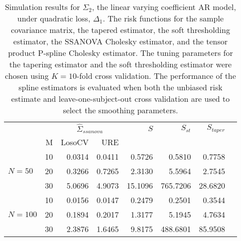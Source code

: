 \documentclass[12pt]{article}
\theoremstyle{definition}
\begin{document}

\begin{table}[ht]
\centering
\caption{Simulation results for $\Sigma_2$, the  linear varying coefficient AR model, under quadratic loss, $\Delta_1$. The risk functions for the sample covariance matrix, the tapered estimator, the soft thresholding estimator, the SSANOVA Cholesky estimator, and the tensor product P-spline Cholesky estimator. The tuning parameters for the tapering estimator and the soft thresholding estimator were chosen using $K = 10$-fold cross validation. The performance of the spline estimators is evaluated when both the unbiased risk estimate and leave-one-subject-out cross validation are used to select the smoothing parameters.}
\begin{tabular}{l|r|rrrrrr}
&  & \multicolumn{2}{c}{$\hat{\Sigma}_{ssanova}$} & $S$ & $S_{st}$ & $S_{taper}$ \\ 
&M & \mbox{LosoCV} & \mbox{URE} &  \\ 
  \hline
&    10 & 0.0314 &  0.0411	&0.5726  & 0.5810 & 0.7758\\ 
$N = 50 $ &    20 & 0.3266 & 0.7265	& 2.3130   & 5.5964 & 2.7545  \\ 
 &    30 & 5.0696 &  4.9073	 &15.1096 & 765.7206 & 28.6820  \\ \hdashline
 &    10 & 0.0156 &  0.0147	& 0.2479  & 0.2501 & 0.3544 \\ 
$N = 100$ &    20 & 0.1894 &  0.2017	 &1.3177 & 5.1945 & 4.7634 \\ 
  &    30 & 2.3876 &	1.6465  & 9.8175 & 488.6801 & 85.9508\\ 
\end{tabular}
\end{table}
\end{document}
